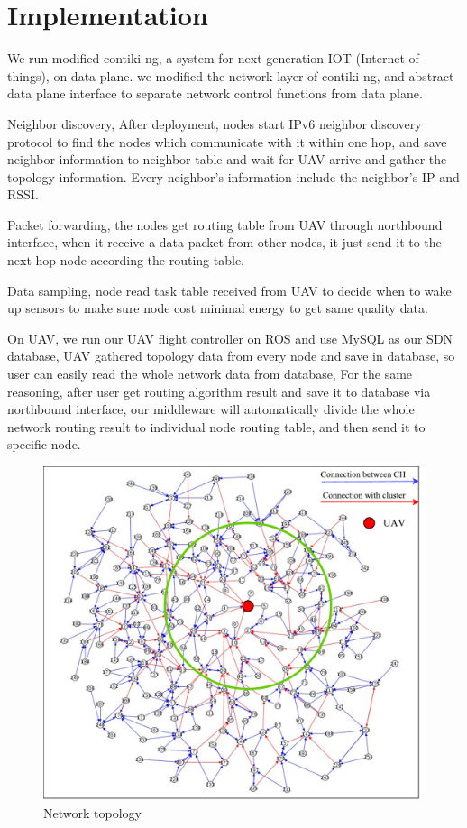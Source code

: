 \section{Implementation}
\label{Imp}

We run modified contiki-ng, a system for next generation IOT (Internet of things), on data plane. we modified the network layer of contiki-ng, and abstract data plane interface to separate network control functions from data plane. 

Neighbor discovery, After deployment, nodes start IPv6 neighbor discovery protocol to find the nodes which communicate with it within one hop, and save neighbor information to neighbor table and wait for UAV arrive 
and gather the topology information. Every neighbor's information include the neighbor's IP and RSSI. 

Packet forwarding, the nodes get routing table from UAV through northbound interface, when it receive a data packet from other nodes, it just send it to the next hop node according the routing table.

Data sampling, node read task table received from UAV to decide when to wake up sensors to make sure node cost minimal energy to get same quality data. 

On UAV, we run our UAV flight controller on ROS and use MySQL as our SDN database, UAV gathered topology data from every node and save in database, 
so user can easily read the whole network data from database, For the same 
reasoning, after user get routing algorithm result and save it to database via northbound interface, 
our middleware will automatically divide the whole network routing result to individual node routing table, and then send it to specific node.

\begin{figure}[htbp]
	\centering
	\includegraphics[width=.85\columnwidth]{Figure/topology}
	\vspace{-0.1in}
	\caption{Network topology}
	\label{topology}
	\vspace{-0.1in}
\end{figure}

